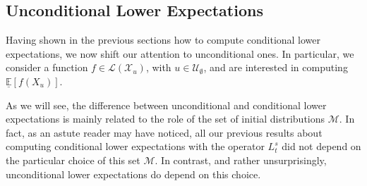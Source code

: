 \documentclass[10pt,a4paper]{paper}
\theoremstyle{definition}
\newtheorem{proposition}[theorem]{Proposition}
\newtheorem{corollary}[theorem]{Corollary}
\newcommand{\reals}{\mathbb{R}}
\newcommand{\realspos}{\reals_{>0}}
\newcommand{\realsnonneg}{\reals_{\geq 0}}
\newcommand{\states}{\mathcal{X}}
\newcommand{\processes}{\mathbb{P}}
\newcommand{\wprocesses}{\processes^{\mathrm{W}}}
\newcommand{\wmprocesses}{\processes^{\mathrm{WM}}}
\newcommand{\gambles}{\mathcal{L}}
\newcommand{\rateset}{\mathcal{Q}}
\newcommand{\lrate}{\underline{Q}}
\newcommand{\norm}[1]{\left\lVert #1 \right\rVert}
\begin{document}
%
%

\subsection{Unconditional Lower Expectations}\label{sec:marginal_lower_exp}

Having shown in the previous sections how to compute conditional lower expectations, we now shift our attention to unconditional ones. In particular, we consider a function $f\in\gambles(\states_u)$, with $u\in\mathcal{U}_{\emptyset}$, and are interested in computing $\underline{\mathbb{E}}[f(X_u)]$. 

As we will see, the difference between unconditional and conditional lower expectations is mainly related to the role of the set of initial distributions $\mathcal{M}$. In fact, as an astute reader may have noticed, all our previous results about computing conditional lower expectations with the operator $L_t^s$ did not depend on the particular choice of this set $\mathcal{M}$. %
In contrast, and rather unsurprisingly, unconditional lower expectations do depend on this choice.
\end{document}
